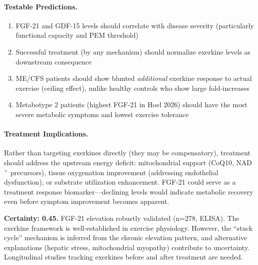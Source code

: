 \begin{hypothesis}
\paragraph{Testable Predictions.}
\begin{enumerate}
    \item FGF-21 and GDF-15 levels should correlate with disease severity (particularly functional capacity and PEM threshold)
    \item Successful treatment (by any mechanism) should normalize exerkine levels as downstream consequence
    \item ME/CFS patients should show blunted \textit{additional} exerkine response to actual exercise (ceiling effect), unlike healthy controls who show large fold-increases
    \item Metabotype 2 patients (highest FGF-21 in Hoel 2026) should have the most severe metabolic symptoms and lowest exercise tolerance
\end{enumerate}

\paragraph{Treatment Implications.}
Rather than targeting exerkines directly (they may be compensatory), treatment should address the upstream energy deficit: mitochondrial support (CoQ10, NAD$^+$ precursors), tissue oxygenation improvement (addressing endothelial dysfunction), or substrate utilization enhancement. FGF-21 could serve as a treatment response biomarker---declining levels would indicate metabolic recovery even before symptom improvement becomes apparent.

\textbf{Certainty: 0.45.} FGF-21 elevation robustly validated (n=278, ELISA). The exerkine framework is well-established in exercise physiology. However, the ``stuck cycle'' mechanism is inferred from the chronic elevation pattern, and alternative explanations (hepatic stress, mitochondrial myopathy) contribute to uncertainty. Longitudinal studies tracking exerkines before and after treatment are needed.
\end{hypothesis}

